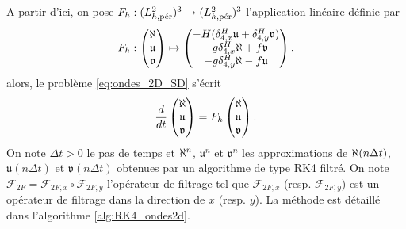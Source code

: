 A partir d'ici, on pose $F_h : (L_{h,\per}^2)^3 \rightarrow (L_{h,\per}^2)^3$ l'application linéaire définie par
\begin{equation}
F_h : \begin{pmatrix}
\etafrak \\ \mathfrak{u} \\ \mathfrak{v}
\end{pmatrix} \mapsto \begin{pmatrix}
- H (\delta_{4,x}^H \mathfrak{u} + \delta_{4,y}^H \mathfrak{v}) \\
- g \delta_{4,x}^H \etafrak + f \mathfrak{v} \\
- g \delta_{4,y}^H \etafrak - f \mathfrak{u}
\end{pmatrix}.
\end{equation}
alors, le problème \eqref{eq:ondes_2D_SD} s'écrit
\begin{equation}
\dfrac{d}{dt} \begin{pmatrix}
\etafrak \\ \mathfrak{u} \\ \mathfrak{v}
\end{pmatrix} = F_h\begin{pmatrix}
\etafrak \\ \mathfrak{u} \\ \mathfrak{v}
\end{pmatrix}.
\end{equation}
On note $\Delta t>0$ le pas de temps et $\etafrak^n$, $\mathfrak{u}^n$ et $\mathfrak{v}^n$ les approximations de $\etafrak(n\Delta t)$, $\mathfrak{u}(n \Delta t)$ et $\mathfrak{v}(n \Delta t)$ obtenues par un algorithme de type RK4 filtré. On note $\mathcal{F}_{2F} = \mathcal{F}_{2F,x} \circ \mathcal{F}_{2F,y}$ l'opérateur de filtrage tel que $\mathcal{F}_{2F,x}$ (resp. $\mathcal{F}_{2F,y}$) est un opérateur de filtrage dans la direction de $x$ (resp. $y$). La méthode est détaillé dans l'algorithme \ref{alg:RK4_ondes2d}.

